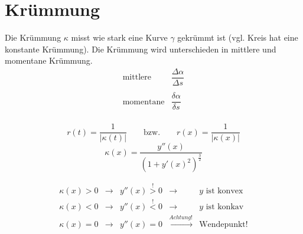 




















\section{Krümmung}

Die Krümmung $\kappa$ misst wie stark eine Kurve $\gamma$ gekrümmt ist (vgl. Kreis hat eine konstante Krümmung).
Die Krümmung wird unterschieden in mittlere und momentane Krümmung.
\[ \begin{array}{ll}
	\text{mittlere}  & \dfrac{\Delta \alpha}{\Delta s} \\
	& \\
	\text{momentane} & \dfrac{\delta \alpha}{\delta s} \\
\end{array} \]

\[ \boxed{r(t) = \dfrac{1}{|\kappa(t)|} \quad \quad \text{bzw.} \quad \quad r(x) = \dfrac{1}{|\kappa(x)|} } \]
\[ \boxed{\kappa(x) = \frac{y''(x)}{(1 + y'(x)^2)^{\frac{3}{2}}} }\]

\[\boxed{\begin{array}{lllll} 
	\kappa (x) > 0 & \rightarrow & y''(x) \stackrel{!}{>} 0 & \rightarrow & y \text{ ist konvex} \\
	\kappa (x) < 0 & \rightarrow & y''(x) \stackrel{!}{<} 0 & \rightarrow & y \text{ ist konkav} \\
	\kappa (x) = 0 & \rightarrow & y''(x) = 0		& \xrightarrow[]{Achtung!} & \text{Wendepunkt!}
\end{array}}\]

